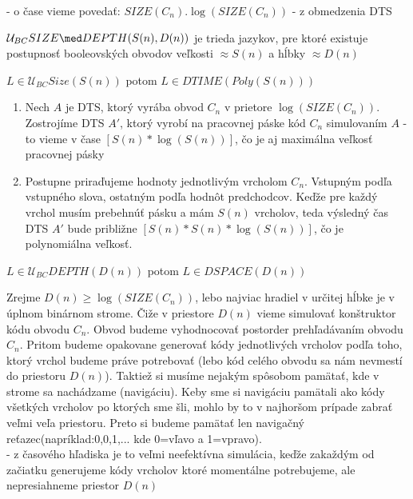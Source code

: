 - o čase vieme povedať: $SIZE(C_n).\log(SIZE(C_n))$ - z obmedzenia DTS

\begin{oznacenie}
$\mathcal{U}_{BC}SIZE \med DEPTH(S(n),D(n))$ je trieda jazykov, pre ktoré existuje
postupnosť booleovských obvodov veľkosti $\approx S(n)$ a hĺbky $\approx D(n)$
\end{oznacenie}

\begin{veta}\label{Veta1}
$L\in \mathcal{U}_{BC}Size(S(n))$ potom $L\in DTIME(Poly(S(n)))$
\end{veta}

\begin{dokaz}
\begin{enumerate}
\item Nech $A$ je DTS, ktorý vyrába obvod $C_n$ v prietore $\log(SIZE(C_n))$. Zostrojíme DTS
$A'$, ktorý vyrobí na pracovnej páske kód $C_n$ simulovaním $A$ - to vieme v čase
$[S(n)*\log(S(n))]$, čo je aj maximálna veľkosť pracovnej pásky
\item Postupne priraďujeme hodnoty jednotlivým vrcholom $C_n$. Vstupným podľa vstupného
slova, ostatným podľa hodnôt predchodcov. Keďže pre každý vrchol musím prebehnúť pásku a
mám $S(n)$ vrcholov, teda výsledný čas DTS $A'$ bude približne $[S(n)*S(n)*\log(S(n))]$,
čo je polynomiálna veľkosť.
\end{enumerate}
\end{dokaz}

\begin{veta}\label{Veta2}
$L\in \mathcal{U}_{BC}DEPTH(D(n))$ potom $L\in DSPACE(D(n))$
\end{veta}

\begin{dokaz}
Zrejme $D(n)\geq \log(SIZE(C_n))$, lebo najviac hradiel v určitej hĺbke je v úplnom
binárnom strome. Čiže v priestore $D(n)$ vieme simulovať konštruktor kódu obvodu $C_n$.
Obvod budeme vyhodnocovať postorder prehľadávaním obvodu $C_n$. Pritom budeme opakovane
generovať kódy jednotlivých vrcholov podľa toho, ktorý vrchol budeme práve potrebovať
(lebo kód celého obvodu sa nám nevmestí do priestoru $D(n)$). Taktiež si musíme nejakým
spôsobom pamätať, kde v strome sa nachádzame (navigáciu). Keby sme si navigáciu pamätali
ako kódy všetkých vrcholov po ktorých sme šli, mohlo by to v najhoršom prípade zabrať
veľmi veľa priestoru. Preto si budeme pamätať len navigačný reťazec(napríklad:0,0,1,...
kde 0=vľavo a 1=vpravo).\\ - z časového hľadiska je to veľmi neefektívna simulácia, keďže
zakaždým od začiatku generujeme kódy vrcholov ktoré momentálne potrebujeme, ale
nepresiahneme priestor $D(n)$
\end{dokaz}

